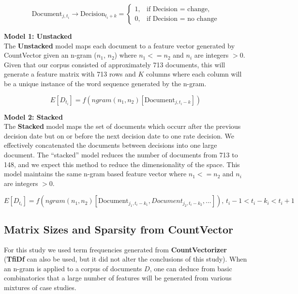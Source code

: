 \documentclass[11pt]{article}
\newcommand{\vertSpace}[1]{\vspace{3mm}}
\begin{document}
{\begin{equation*}
\mbox{Document}_{j,t_i} \rightarrow \mbox{Decision}_{t_i+k}
 = \begin{cases}
  1, & \text{if  Decision = change}, \\
  0, & \text{if  Decision = no change}
\end{cases}
\end{equation*}

\noindent 
\textbf{Model 1: Unstacked}\\
\noindent
The \textbf{Unstacked} model maps each document to a feature vector generated by CountVector given an n-gram ($n_1$, $n_2$) where $n_1 <= n_2$ and $n_i$ are integers $>0$.  Given that our corpus consisted of approximately 713 documents, this will generate a feature matrix with 713 rows and $K$ columns where each column will be a unique instance of the word sequence generated by the n-gram.

\begin{equation*}
E[D_{t_i}] = f(ngram(n_1, n_2)[\mbox{Document}_{j,t_i-k}])
\end{equation*}

\noindent
\textbf{Model 2: Stacked}\\
The \textbf{Stacked} model maps the set of documents which occurr after the previous decision date but on or before the next decision date to one rate decision.  We effectively concatenated the documents between decisions into one large document.  The ``stacked'' model reduces the number of documents from 713 to 148, and we expect this method to reduce the dimensionality of the space.  This model maintains the same n-gram based feature vector where $n_1 <= n_2$ and $n_i$ are integers $>0$.

\begin{equation*}
E[D_{t_i}] = f(ngram(n_1, n_2)[\mbox{Document}_{j_1,t_i-k_1},{Document}_{j_2,t_i-k_2},...]) \text{, } t_i-1 < t_i-k_i < t_i+1
\end{equation*}

\subsection{Matrix Sizes and Sparsity from CountVector}

\noindent For this study we used term frequencies generated from \textbf{CountVectorizer} (\textbf{TfiDf} can also be used, but it did not alter the conclusions of this study).  When an n-gram is applied to a corpus of documents $D$, one can deduce from basic combinatorics that a large number of features will be generated from various mixtures of case studies.  \vertSpace

}
\end{document}
